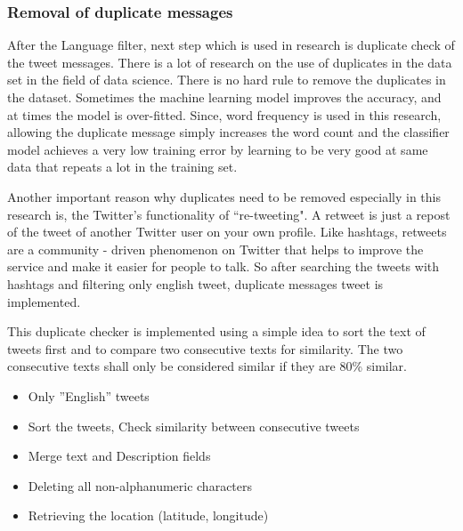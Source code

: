 \subsubsection{Removal of duplicate messages}
After the Language filter, next step which is used in research is duplicate check of the tweet messages. There is a lot of research on the use of duplicates in the data set in the field of data science. There is no hard rule to remove the duplicates in the dataset. Sometimes the machine learning model improves the accuracy, and at times  the model is over-fitted. Since, word frequency is used in this research, allowing the duplicate message simply increases the word count and the classifier model
achieves a very low training error by learning to be very good at same data that repeats a lot in the training set.

Another important reason why duplicates need to be removed especially in this research is, the Twitter's functionality of ``re-tweeting". A retweet is just a repost of the tweet of another Twitter user on your own profile. Like hashtags, retweets are a community - driven phenomenon on Twitter that helps to improve the service and make it easier for people to talk. So after searching the tweets with hashtags and filtering only english tweet, duplicate messages tweet is implemented.

This duplicate checker is implemented using a simple idea to sort the text of tweets first and to compare two consecutive texts for similarity. The two consecutive texts shall only be considered similar if they are 80\% similar.

\begin{itemize}
  \item Only ”English” tweets
  \item Sort the tweets, Check similarity between consecutive tweets
  \item Merge text and Description fields
  \item Deleting all non-alphanumeric characters
  \item Retrieving the location (latitude, longitude)
\end{itemize}


